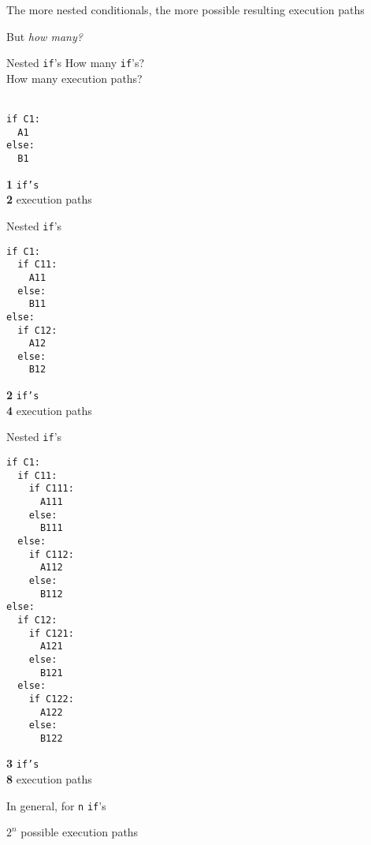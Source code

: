 \documentclass{beamer}
\begin{document}
\begin{slide}{
\item The more nested conditionals, the more possible resulting execution paths
\item But \textit{how many?}
}\end{slide}

\begin{frame}[fragile]{Nested \texttt{if}'s}
How many \texttt{if}'s? \\ 
How many execution paths? \\ \ \\

\begin{lstlisting}[frame=shadowbox,basicstyle=\ttfamily\tiny]
if C1:
  A1
else:
  B1
\end{lstlisting}

\pause

\textbf{1} \texttt{if's} \\
\textbf{2} execution paths \\
\end{frame}

\begin{frame}[fragile]{Nested \texttt{if}'s}
\begin{lstlisting}[frame=shadowbox,basicstyle=\ttfamily\tiny]
if C1:
  if C11:
    A11
  else:
    B11
else:
  if C12:
    A12
  else:
    B12
\end{lstlisting}

\pause

\textbf{2} \texttt{if's} \\
\textbf{4} execution paths \\
\end{frame}

\begin{frame}[fragile]{Nested \texttt{if}'s}
\begin{lstlisting}[frame=shadowbox,basicstyle=\ttfamily\tiny]
if C1:
  if C11:
    if C111:
      A111
    else:
      B111
  else:
    if C112:
      A112
    else:
      B112
else:
  if C12:
    if C121:
      A121
    else:
      B121
  else:
    if C122:
      A122
    else:
      B122
\end{lstlisting}

\pause

\textbf{3} \texttt{if's} \\
\textbf{8} execution paths \\
\end{frame}

\begin{slide}{
\item In general, for \texttt{n} \texttt{if}'s
\item $2^n$ possible execution paths 
}\end{slide}
\end{document}
